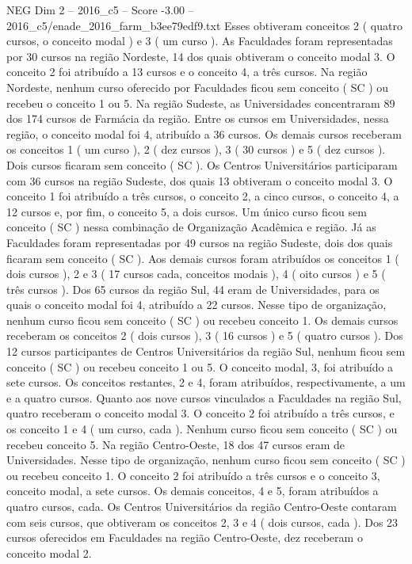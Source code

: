 \begin{textsample}{NEG Dim 2 – 2016\_c5 – Score -3.00 – 2016\_c5/enade\_2016\_farm\_b3ee79edf9.txt}
Esses obtiveram conceitos 2 ( quatro cursos, o conceito modal ) e 3 ( um curso ).
As Faculdades foram representadas por 30 cursos na região Nordeste, 14 dos quais obtiveram o conceito modal 3.
O conceito 2 foi atribuído a 13 cursos e o conceito 4, a três cursos.
Na região Nordeste, nenhum curso oferecido por Faculdades ficou sem conceito ( SC ) ou recebeu o conceito 1 ou 5.
Na região Sudeste, as Universidades concentraram 89 dos 174 cursos de Farmácia da região.
Entre os cursos em Universidades, nessa região, o conceito modal foi 4, atribuído a 36 cursos.
Os demais cursos receberam os conceitos 1 ( um curso ), 2 ( dez cursos ), 3 ( 30 cursos ) e 5 ( dez cursos ).
Dois cursos ficaram sem conceito ( SC ).
Os Centros Universitários participaram com 36 cursos na região Sudeste, dos quais 13 obtiveram o conceito modal 3.
O conceito 1 foi atribuído a três cursos, o conceito 2, a cinco cursos, o conceito 4, a 12 cursos e, por fim, o conceito 5, a dois cursos.
Um único curso ficou sem conceito ( SC ) nessa combinação de Organização Acadêmica e região.
Já as Faculdades foram representadas por 49 cursos na região Sudeste, dois dos quais ficaram sem conceito ( SC ).
Aos demais cursos foram atribuídos os conceitos 1 ( dois cursos ), 2 e 3 ( 17 cursos cada, conceitos modais ), 4 ( oito cursos ) e 5 ( três cursos ).
Dos 65 cursos da região Sul, 44 eram de Universidades, para os quais o conceito modal foi 4, atribuído a 22 cursos.
Nesse tipo de organização, nenhum curso ficou sem conceito ( SC ) ou recebeu conceito 1.
Os demais cursos receberam os conceitos 2 ( dois cursos ), 3 ( 16 cursos ) e 5 ( quatro cursos ).
Dos 12 cursos participantes de Centros Universitários da região Sul, nenhum ficou sem conceito ( SC ) ou recebeu conceito 1 ou 5.
O conceito modal, 3, foi atribuído a sete cursos.
Os conceitos restantes, 2 e 4, foram atribuídos, respectivamente, a um e a quatro cursos.
Quanto aos nove cursos vinculados a Faculdades na região Sul, quatro receberam o conceito modal 3.
O conceito 2 foi atribuído a três cursos, e os conceito 1 e 4 ( um curso, cada ).
Nenhum curso ficou sem conceito ( SC ) ou recebeu conceito 5.
Na região Centro-Oeste, 18 dos 47 cursos eram de Universidades.
Nesse tipo de organização, nenhum curso ficou sem conceito ( SC ) ou recebeu conceito 1.
O conceito 2 foi atribuído a três cursos e o conceito 3, conceito modal, a sete cursos.
Os demais conceitos, 4 e 5, foram atribuídos a quatro cursos, cada.
Os Centros Universitários da região Centro-Oeste contaram com seis cursos, que obtiveram os conceitos 2, 3 e 4 ( dois cursos, cada ).
Dos 23 cursos oferecidos em Faculdades na região Centro-Oeste, dez receberam o conceito modal 2.

\end{textsample}
